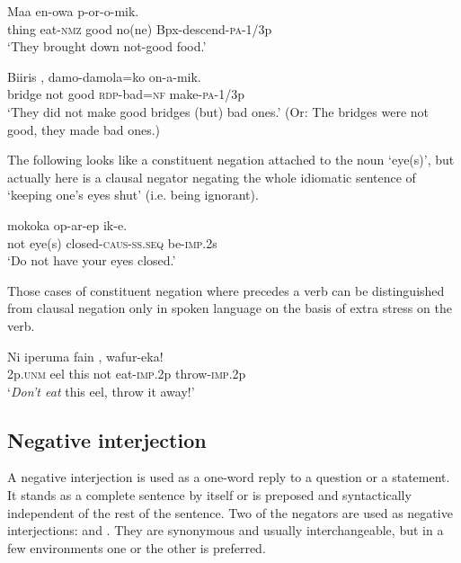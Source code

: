 \ea%
\label{ex:x1106}
\gll Maa  en-owa      p-or-o-mik. \\
thing  eat-\textsc{nmz}  good  no(ne)  Bpx-descend-\textsc{pa}-1/3p\\
\glt `They brought down not-good food.'
\z

\ea%
\label{ex:x1107}
\gll Biiris    ,  damo-damola=ko  on-a-mik. \\
bridge  not  good  \textsc{rdp}-bad=\textsc{nf}  make-\textsc{pa}-1/3p\\
\glt `They did not make good bridges (but) bad ones.' (Or: The bridges were not good, they made bad ones.) 
\z

The following looks like a constituent negation attached to the noun  `eye(s)', but actually   here is a clausal negator negating the whole idiomatic sentence of `keeping one's eyes shut' (i.e. being ignorant).

\ea%
\label{ex:x1114}
\gll {}  mokoka  op-ar-ep  ik-e. \\
not  eye(s)  closed-\textsc{caus}-\textsc{ss}.\textsc{seq}  be-\textsc{imp}.2s\\
\glt `Do not have your eyes closed.'
\z

Those cases of constituent negation where   precedes a verb can be distinguished from clausal negation only in spoken language on the basis of extra stress on the verb.

\ea%
\label{ex:x1110}
\gll Ni  iperuma  fain    ,  wafur-eka! \\
2p.\textsc{unm}  eel  this  not  eat-\textsc{imp}.2p  throw-\textsc{imp}.2p\\
\glt `\textit{Don't eat}  this eel, throw it away!'
\z

\subsection{Negative interjection}
{}
A negative interjection is used as a one-word reply to a question or a statement. It stands as a complete sentence by itself or is preposed and syntactically independent of the rest of the sentence. Two of the negators are used as negative interjections:  and . They are synonymous and usually interchangeable, but in a few environments one or the other is preferred.


